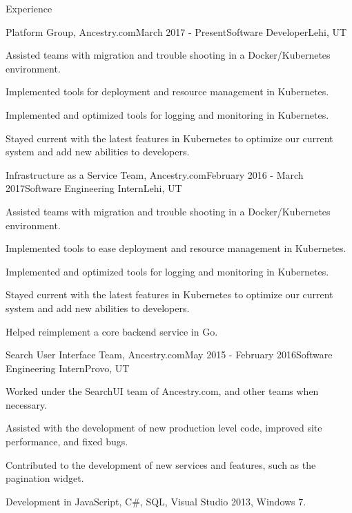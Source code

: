 \documentclass{resume} %
\begin{document}
\begin{rSection}{Experience}

  \begin{rSubsection}{Platform Group, Ancestry.com}{March 2017 - Present}{Software Developer}{Lehi, UT}
  \item Assisted teams with migration and trouble shooting in a Docker/Kubernetes environment.
  \item Implemented tools for deployment and resource management in Kubernetes.
  \item Implemented and optimized tools for logging and monitoring in Kubernetes.
  \item Stayed current with the latest features in Kubernetes to optimize our current system and add new abilities to developers. 
  \end{rSubsection}
  
  \begin{rSubsection}{Infrastructure as a Service Team, Ancestry.com}{February 2016 - March 2017}{Software Engineering Intern}{Lehi, UT}
  \item Assisted teams with migration and trouble shooting in a Docker/Kubernetes environment.
  \item Implemented tools to ease deployment and resource management in Kubernetes.
  \item Implemented and optimized tools for logging and monitoring in Kubernetes.
  \item Stayed current with the latest features in Kubernetes to optimize our current system and add new abilities to developers.
  \item Helped reimplement a core backend service in Go.
  \end{rSubsection}

  \begin{rSubsection}{Search User Interface Team, Ancestry.com}{May 2015 - February 2016}{Software Engineering Intern}{Provo, UT}
  \item Worked under the SearchUI team of Ancestry.com, and other teams when necessary.
  \item Assisted with the development of new production level code, improved site performance, and fixed bugs.
  \item Contributed to the development of new services and features, such as the pagination widget.
  \item Development in JavaScript, C\#, SQL, Visual Studio 2013, Windows 7.
  \end{rSubsection}


\end{rSection}
\end{document}
